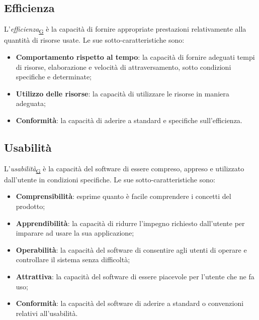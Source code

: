 \documentclass[a4paper,12pt]{article}
\begin{document}
\subsection{Efficienza}
L'\textit{efficienza}\textsubscript{\href{https://atlasteam9.github.io/Atlas/glossario.html\#Efficienza}{G}} è la capacità di fornire appropriate prestazioni relativamente alla quantità di risorse usate. Le sue sotto-caratteristiche sono:
\begin{itemize}
    \item \textbf{Comportamento rispetto al tempo}: la capacità di fornire adeguati tempi di risorse, elaborazione e velocità di attraversamento, sotto condizioni specifiche e determinate;
    \item \textbf{Utilizzo delle risorse}: la capacità di utilizzare le risorse in maniera adeguata;
    \item \textbf{Conformità}: la capacità di aderire a standard e specifiche sull'efficienza.
\end{itemize}
\subsection{Usabilità}
L'\textit{usabilità}\textsubscript{\href{https://atlasteam9.github.io/Atlas/glossario.html\#Usabilità}{G}} è la capacità del software di essere compreso, appreso e utilizzato dall'utente in condizioni specifiche. Le sue sotto-caratteristiche sono:
\begin{itemize}
    \item \textbf{Comprensibilità}: esprime quanto è facile comprendere i concetti del prodotto;
    \item \textbf{Apprendibilità}: la capacità di ridurre l'impegno richiesto dall'utente per imparare ad usare la sua applicazione;
    \item \textbf{Operabilità}: la capacità del software di consentire agli utenti di operare e controllare il sistema senza difficoltà;
    \item \textbf{Attrattiva}: la capacità del software di essere piacevole per l'utente che ne fa uso;
    \item \textbf{Conformità}: la capacità del software di aderire a standard o convenzioni relativi all'usabilità.
\end{itemize}
\end{document}
